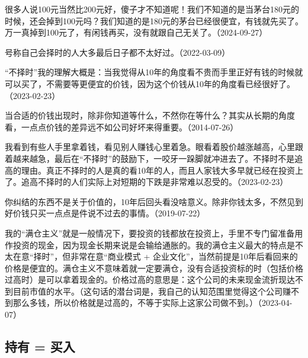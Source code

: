 
很多人说100元当然比200元好，傻子才不知道呢！我们不知道的是当茅台180元的时候，还会掉到100元吗？我们知道的是180元的茅台已经很便宜，有钱就先买了。万一真掉到100元了，有闲钱再买，没有就跟自己无关了。（2024-09-27）


号称自己会择时的人大多最后日子都不太好过。（2022-03-09）

“不择时”我的理解大概是：当我觉得从10年的角度看不贵而手里正好有钱的时候就可以买了，不需要等更便宜的价钱，因为这个价钱从10年的角度看已经很好了。（2023-02-23）

当合适的价钱出现时，除非你知道等什么，不然你在等什么？其实从长期的角度看，一点点价钱的差异远不如公司好坏来得重要。（2014-07-26）

我看到有些人手里拿着钱，看见别人赚钱心里着急。眼看着股价越涨越高，心里跟着越来越急，最后在“不择时”的鼓励下，一咬牙一跺脚就冲进去了。不择时不是追高的理由。真正不择时的人是真的看10年的人，而且人家钱大多早就已经在投资上了。追高不择时的人们实际上对短期的下跌是非常难以忍受的。（2023-02-23）


你纠结的东西不是关于价值的，10年后回头看没啥意义。除非你钱太多，不然见到好价钱只买一点点是件说不过去的事情。（2019-07-22）

我的“满仓主义”就是一般情况下，要投资的钱都放在投资上，手里不专门留准备用作投资的现金，因为现金长期来说是会输给通胀的。我的满仓主义最大的特点是不太在意“择时”，但非常在意“商业模式 + 企业文化”，当然前提是10年后看回来的价格是便宜的。满仓主义不意味着就一定要满仓，没有合适投资标的时（包括价格过高时）是可以拿着现金的。价格过高的意思是：这个公司的未来现金流折现达不到目前市值的水平。（这句话的潜台词是，我自己的认知范围里觉得这个公司赚不到那么多钱，所以价格就是过高的，不等于实际上这家公司做不到。）（2023-04-07）

\subsection{持有 = 买入}


